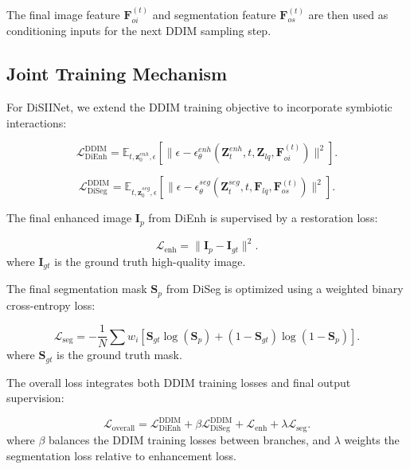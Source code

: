 \documentclass{article}
\begin{document}
The final image feature $\mathbf{F}_{oi}^{(t)}$ and segmentation feature $\mathbf{F}_{os}^{(t)}$ are then used as conditioning inputs for the next DDIM sampling step.


\subsection{Joint Training Mechanism}

For DiSIINet, we extend the DDIM training objective to incorporate symbiotic interactions:

\begin{equation}
\mathcal{L}_{\text{DiEnh}}^{\text{DDIM}} = \mathbb{E}_{t,\mathbf{z}_0^{enh},\epsilon}\left[\|\epsilon - \epsilon_\theta^{enh}(\mathbf{Z}_t^{enh}, t, \mathbf{Z}_{lq}, \mathbf{F}_{oi}^{(t)})\|^2\right].
\end{equation}

\begin{equation}
\mathcal{L}_{\text{DiSeg}}^{\text{DDIM}} = \mathbb{E}_{t,\mathbf{z}_0^{seg},\epsilon}\left[\|\epsilon - \epsilon_\theta^{seg}(\mathbf{Z}_t^{seg}, t, \mathbf{F}_{lq}, \mathbf{F}_{os}^{(t)})\|^2\right].
\end{equation}

The final enhanced image $\mathbf{I}_p$ from DiEnh is supervised by a restoration loss:

\begin{equation}
\mathcal{L}_{\text{enh}} = \|\mathbf{I}_p - \mathbf{I}_{gt}\|^2.
\end{equation}
where $\mathbf{I}_{gt}$ is the ground truth high-quality image.

The final segmentation mask $\mathbf{S}_p$ from DiSeg is optimized using a weighted binary cross-entropy loss:

\begin{equation}
\mathcal{L}_{\text{seg}} = -\frac{1}{N} \sum w_i\left[\mathbf{S}_{gt} \log (\mathbf{S}_p) + (1-\mathbf{S}_{gt}) \log (1-\mathbf{S}_p)\right].
\end{equation}
where $\mathbf{S}_{gt}$ is the ground truth mask.


The overall loss integrates both DDIM training losses and final output supervision:

\begin{equation}
\mathcal{L}_{\text{overall}} = \mathcal{L}_{\text{DiEnh}}^{\text{DDIM}} + \beta\mathcal{L}_{\text{DiSeg}}^{\text{DDIM}} + \mathcal{L}_{\text{enh}} + \lambda\mathcal{L}_{\text{seg}}.
\label{equ8}
\end{equation}
where $\beta$ balances the DDIM training losses between branches, and $\lambda$ weights the segmentation loss relative to enhancement loss.
\end{document}
